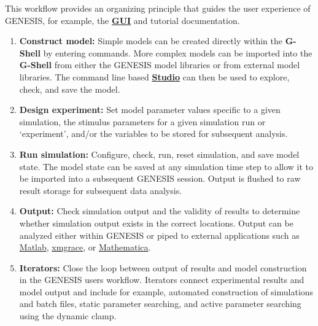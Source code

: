 \documentclass[12pt]{article}
\begin{document}
This workflow provides an organizing principle that guides the user experience of GENESIS, for example, the \href{../gui/gui.tex}{\bf GUI} and tutorial documentation.

\begin{enumerate}

\item {\bf Construct model:} Simple models can be created directly within the {\bf G-Shell} by entering commands. More complex models can be imported into the {\bf G-Shell} from either the GENESIS model libraries or from external model libraries. The command line based \href{../studio/studio.tex}{\bf Studio} can then be used to explore, check, and save the model.

\item {\bf Design experiment:}  Set model parameter values specific to a given simulation, the stimulus parameters for a given simulation run or  `experiment', and/or the variables to be stored for subsequent analysis.

\item  {\bf Run simulation:} Configure, check, run, reset simulation, and save model state. The model state can be saved at any simulation time step to allow it to be imported into a subsequent GENESIS session. Output is flushed to raw result storage for subsequent data analysis. 

\item {\bf Output:}  Check simulation output and the validity of results to determine whether simulation output exists in the correct locations. Output can be analyzed either within GENESIS or piped to external applications such as \href{http://www.mathworks.com/}{Matlab}, \href{http://www.mathworks.com/}{xmgrace}, or \href{http://www.wolfram.com/}{Mathematica}.

\item {\bf Iterators:} Close the loop between output of results and model construction in the GENESIS users workflow. Iterators connect experimental results and model output and include for example, automated construction of simulations and batch files, static parameter searching, and active parameter searching using the dynamic clamp. 

\end{enumerate}
\end{document}
